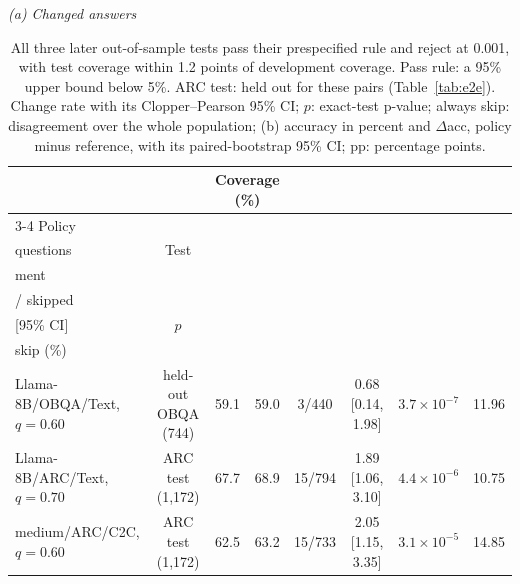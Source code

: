 \begin{table}[!htbp]\centering\scriptsize
\caption{All three later out-of-sample tests pass their prespecified rule and reject at 0.001, with test coverage within 1.2 points of development coverage. Pass rule: a 95\% upper bound below 5\%. ARC test: held out for these pairs (Table~\ref{tab:e2e}). Change rate with its Clopper--Pearson 95\% CI; $p$: exact-test p-value; always skip: disagreement over the whole population; (b) accuracy in percent and $\Delta$acc, policy minus reference, with its paired-bootstrap 95\% CI; pp: percentage points.}
\label{tab:oos_later}
\renewcommand{\arraystretch}{1.1}\setlength{\tabcolsep}{2.5pt}
\vspace{5pt}\textit{(a) Changed answers}\par\smallskip
\begin{tabular*}{\linewidth}{@{}l@{\hspace{5pt}\extracolsep{\fill}}ccccccc@{}}\toprule
& & \multicolumn{2}{c}{Coverage (\%)} & & & & \\\cmidrule(lr){3-4}
Policy & \begin{tabular}[b]{@{}c@{}}Test\\questions\end{tabular} & Test & \begin{tabular}[b]{@{}c@{}}Develop-\\ment\end{tabular} & \begin{tabular}[b]{@{}c@{}}Changed\\/ skipped\end{tabular} & \begin{tabular}[b]{@{}c@{}}Change rate (\%)\\{}[95\% CI]\end{tabular} & $p$ & \begin{tabular}[b]{@{}c@{}}Always\\skip (\%)\end{tabular}\\\midrule
Llama-8B/OBQA/Text, $q=0.60$ & held-out OBQA (744) & 59.1 & 59.0 & 3/440 & 0.68 [0.14, 1.98] & $3.7\times10^{-7}$ & 11.96\\
Llama-8B/ARC/Text, $q=0.70$ & ARC test (1,172) & 67.7 & 68.9 & 15/794 & 1.89 [1.06, 3.10] & $4.4\times10^{-6}$ & 10.75\\
medium/ARC/C2C, $q=0.60$ & ARC test (1,172) & 62.5 & 63.2 & 15/733 & 2.05 [1.15, 3.35] & $3.1\times10^{-5}$ & 14.85\\\bottomrule
\end{tabular*}

\end{table}
